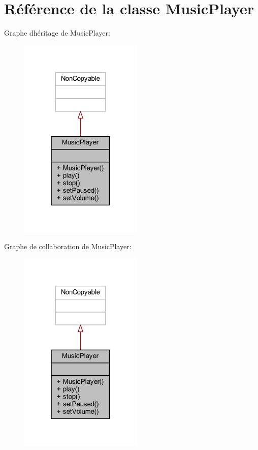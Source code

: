 \hypertarget{class_music_player}{}\section{Référence de la classe Music\+Player}
\label{class_music_player}


Graphe d\textquotesingle{}héritage de Music\+Player\+:\nopagebreak
\begin{figure}[H]
\begin{center}
\leavevmode
\includegraphics[width=166pt]{class_music_player__inherit__graph}
\end{center}
\end{figure}


Graphe de collaboration de Music\+Player\+:\nopagebreak
\begin{figure}[H]
\begin{center}
\leavevmode
\includegraphics[width=166pt]{class_music_player__coll__graph}
\end{center}
\end{figure}
